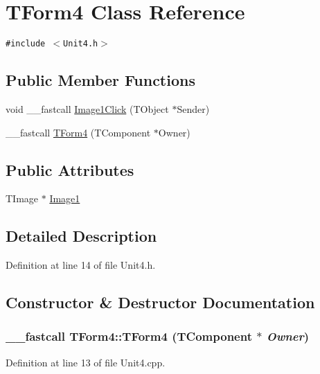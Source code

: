 \hypertarget{classTForm4}{
\section{TForm4 Class Reference}
\label{classTForm4}
}
{\tt \#include $<$Unit4.h$>$}

\subsection*{Public Member Functions}
\begin{CompactItemize}
\item 
void \_\-\_\-fastcall \hyperlink{classTForm4_940bfe645e8bfa4b957cb07f027c0761}{Image1Click} (TObject $\ast$Sender)
\item 
\_\-\_\-fastcall \hyperlink{classTForm4_9dcb2e51ac2331d1b391875afaae53a7}{TForm4} (TComponent $\ast$Owner)
\end{CompactItemize}
\subsection*{Public Attributes}
\begin{CompactItemize}
\item 
TImage $\ast$ \hyperlink{classTForm4_af7ff6a81c3378b0c7245d55372576df}{Image1}
\end{CompactItemize}


\subsection{Detailed Description}


Definition at line 14 of file Unit4.h.

\subsection{Constructor \& Destructor Documentation}
\hypertarget{classTForm4_9dcb2e51ac2331d1b391875afaae53a7}{
\subsubsection[TForm4]{\setlength{\rightskip}{0pt plus 5cm}\_\-\_\-fastcall TForm4::TForm4 (TComponent $\ast$ {\em Owner})}}
\label{classTForm4_9dcb2e51ac2331d1b391875afaae53a7}




Definition at line 13 of file Unit4.cpp.

